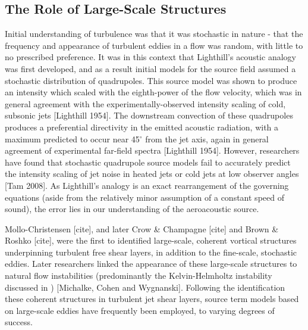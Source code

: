 \subsection{The Role of Large-Scale Structures}
Initial understanding of turbulence was that it was stochastic in nature - that the frequency and appearance of turbulent eddies in a flow was random, with little to no prescribed preference.
It was in this context that Lighthill's acoustic analogy was first developed, and as a result initial models for the source field assumed a stochastic distribution of quadrupoles.
This source model was shown to produce an intensity which scaled with the eighth-power of the flow velocity, which was in general agreement with the experimentally-observed intensity scaling of cold, subsonic jets [Lighthill 1954].
The downstream convection of these quadrupoles produces a preferential directivity in the emitted acoustic radiation, with a maximum predicted to occur near 45$^\circ$ from the jet axis, again in general agreement of experimental far-field spectra [Lighthill 1954].
However, researchers have found that stochastic quadrupole source models fail to accurately predict the intensity scaling of jet noise in heated jets or cold jets at low observer angles [Tam 2008].
As Lighthill's analogy is an exact rearrangement of the governing equations (aside from the relatively minor assumption of a constant speed of sound), the error lies in our understanding of the aeroacoustic source. 

Mollo-Christensen [cite], and later Crow \& Champagne [cite] and Brown \& Roshko [cite], were the first to identified large-scale, coherent vortical structures underpinning turbulent free shear layers, in addition to the fine-scale, stochastic eddies.
Later researchers linked the appearance of these large-scale structures to natural flow instabilities (predominantly the Kelvin-Helmholtz instability discussed in ) [Michalke, Cohen and Wygnanski].
Following the identification these coherent structures in turbulent jet shear layers, source term models based on large-scale eddies have frequently been employed, to varying degrees of success. 

